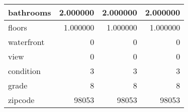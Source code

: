 \begin{table}[H]
\begin{tabular}{|l|r|r|r|}
\hline bathrooms & \cellcolor[rgb]{0.9, 0.54, 0.52} 2.000000 & \cellcolor[rgb]{0.9, 0.54, 0.52} 2.000000 & \cellcolor[rgb]{0.9, 0.54, 0.52} 2.000000 \\
\hline floors & \cellcolor[rgb]{0.9, 0.54, 0.52} 1.000000 & \cellcolor[rgb]{0.9, 0.54, 0.52} 1.000000 & \cellcolor[rgb]{0.9, 0.54, 0.52} 1.000000 \\
\hline waterfront & \cellcolor[rgb]{0.9, 0.54, 0.52} 0 & \cellcolor[rgb]{0.9, 0.54, 0.52} 0 & \cellcolor[rgb]{0.9, 0.54, 0.52} 0 \\
\hline view & \cellcolor[rgb]{0.9, 0.54, 0.52} 0 & \cellcolor[rgb]{0.9, 0.54, 0.52} 0 & \cellcolor[rgb]{0.9, 0.54, 0.52} 0 \\
\hline condition & \cellcolor[rgb]{0.9, 0.54, 0.52} 3 & \cellcolor[rgb]{0.9, 0.54, 0.52} 3 & \cellcolor[rgb]{0.9, 0.54, 0.52} 3 \\
\hline grade & \cellcolor[rgb]{0.9, 0.54, 0.52} 8 & \cellcolor[rgb]{0.9, 0.54, 0.52} 8 & \cellcolor[rgb]{0.9, 0.54, 0.52} 8 \\
\hline zipcode & \cellcolor[rgb]{0.9, 0.54, 0.52} 98053 & \cellcolor[rgb]{0.9, 0.54, 0.52} 98053 & \cellcolor[rgb]{0.9, 0.54, 0.52} 98053 \\
\hline
\end{tabular}
\end{table}
